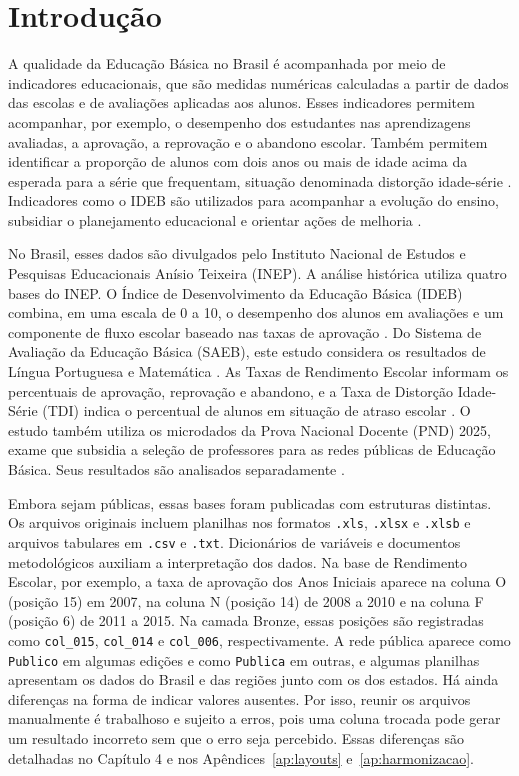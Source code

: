\chapter[Introdução]{Introdução}

A qualidade da Educação Básica no Brasil é acompanhada por meio de indicadores educacionais, que são medidas numéricas calculadas a partir de dados das escolas e de avaliações aplicadas aos alunos. Esses indicadores permitem acompanhar, por exemplo, o desempenho dos estudantes nas aprendizagens avaliadas, a aprovação, a reprovação e o abandono escolar. Também permitem identificar a proporção de alunos com dois anos ou mais de idade acima da esperada para a série que frequentam, situação denominada distorção idade-série \cite[p.~17]{inep2004dicionario}. Indicadores como o IDEB são utilizados para acompanhar a evolução do ensino, subsidiar o planejamento educacional e orientar ações de melhoria \cite{dias2026avaliaccao}.

No Brasil, esses dados são divulgados pelo Instituto Nacional de Estudos e Pesquisas Educacionais Anísio Teixeira (INEP). A análise histórica utiliza quatro bases do INEP. O Índice de Desenvolvimento da Educação Básica (IDEB) combina, em uma escala de 0 a 10, o desempenho dos alunos em avaliações e um componente de fluxo escolar baseado nas taxas de aprovação \cite{inep2024ideb,inep2007notatecnicaideb}. Do Sistema de Avaliação da Educação Básica (SAEB), este estudo considera os resultados de Língua Portuguesa e Matemática \cite{inep2025saeb}. As Taxas de Rendimento Escolar informam os percentuais de aprovação, reprovação e abandono, e a Taxa de Distorção Idade-Série (TDI) indica o percentual de alunos em situação de atraso escolar \cite{inep2025rendimento,inep2026tdi}. O estudo também utiliza os microdados da Prova Nacional Docente (PND) 2025, exame que subsidia a seleção de professores para as redes públicas de Educação Básica. Seus resultados são analisados separadamente \cite{inep2025pnd,inep2026notatecnica1}.

Embora sejam públicas, essas bases foram publicadas com estruturas distintas. Os arquivos originais incluem planilhas nos formatos \texttt{.xls}, \texttt{.xlsx} e \texttt{.xlsb} e arquivos tabulares em \texttt{.csv} e \texttt{.txt}. Dicionários de variáveis e documentos metodológicos auxiliam a interpretação dos dados. Na base de Rendimento Escolar, por exemplo, a taxa de aprovação dos Anos Iniciais aparece na coluna O (posição 15) em 2007, na coluna N (posição 14) de 2008 a 2010 e na coluna F (posição 6) de 2011 a 2015. Na camada Bronze, essas posições são registradas como \texttt{col\_015}, \texttt{col\_014} e \texttt{col\_006}, respectivamente. A rede pública aparece como \texttt{Publico} em algumas edições e como \texttt{Publica} em outras, e algumas planilhas apresentam os dados do Brasil e das regiões junto com os dos estados. Há ainda diferenças na forma de indicar valores ausentes. Por isso, reunir os arquivos manualmente é trabalhoso e sujeito a erros, pois uma coluna trocada pode gerar um resultado incorreto sem que o erro seja percebido. Essas diferenças são detalhadas no Capítulo 4 e nos Apêndices~\ref{ap:layouts} e~\ref{ap:harmonizacao}.

